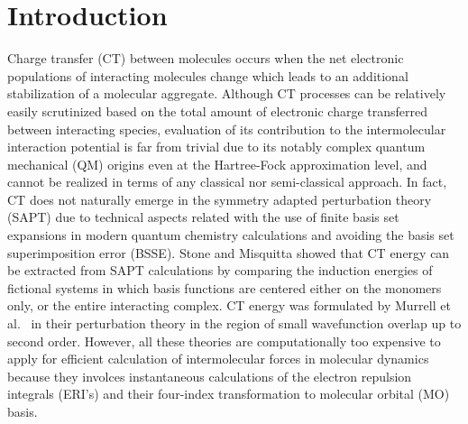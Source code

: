 \pacs{}

\maketitle

\tableofcontents

\section{\label{s:1.introduction}Introduction}

Charge transfer (CT) between molecules occurs when the net electronic populations 
of interacting molecules change which leads to an additional stabilization 
of a molecular aggregate.\cite{Otto.Ladik.IJQC.1980,Stone.TheTheoryOfIntermolecularForces.1996}
Although CT processes can be relatively easily scrutinized based
on the total amount of electronic charge transferred between interacting species,\cite{Otto.Ladik.IJQC.1980}
evaluation of its contribution to the intermolecular interaction
potential\cite{Stone.TheTheoryOfIntermolecularForces.1996} is far from trivial due to 
its notably complex quantum mechanical (QM) origins 
even at the Hartree\hyp{}Fock\cite{Roothaan.RevModPhys.1951} 
approximation level,\cite{Otto.Ladik.ChemPhys.1975}
and cannot be realized in terms of any classical nor semi\hyp{}classical approach.
In fact, CT does not naturally emerge in the symmetry 
adapted perturbation theory\cite{Jeziorski.Moszynski.Szalewicz.ChemRev.1994} (SAPT)
due to technical aspects related with the use of finite basis set expansions
in modern quantum chemistry calculations and avoiding the basis set superimposition error (BSSE). 
Stone and Misquitta showed that CT energy
can be extracted from SAPT calculations by comparing the induction energies
of fictional systems in which basis functions are centered either on the monomers only, or the entire 
interacting complex.\cite{Stone.Misquitta.CPL.2009}
CT energy was formulated by Murrell et al.~\cite{Murrell.Randic.Williams.Longuet-Higgins.ProcRSocLondA.1965} 
in their perturbation theory in the region of small wavefunction overlap up to second order.
However, all these theories are computationally too expensive to apply for efficient
calculation of intermolecular forces in molecular dynamics because
they involces instantaneous calculations of the electron repulsion integrals (ERI's)
and their four\hyp{}index transformation to molecular orbital (MO) basis.\cite{Otto.Ladik.ChemPhys.1975}

